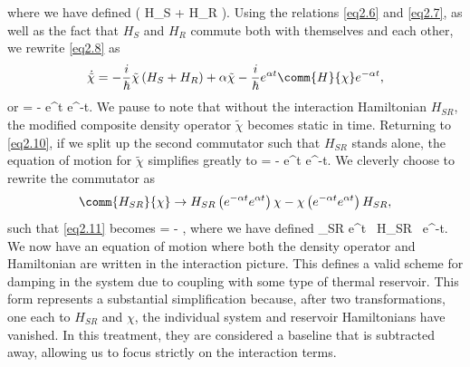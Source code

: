 %
where we have defined
%
\be \alpha \equiv {} \left( H_S + H_R \right). \label{eq2.9} \ee
%
Using the relations \eqref{eq2.6} and \eqref{eq2.7}, as well as the fact that $H_S$ and $H_R$ commute both with themselves and each other, we rewrite \eqref{eq2.8} as
%
\[ \dot{\tilde{\chi}} = -\frac{i}{\hbar} \tilde{\chi} \left( H_S + H_R \right) + \alpha \tilde{\chi} - \frac{i}{\hbar} e^{\alpha t} \comm{H}{\chi} e^{-\alpha t}, \]
%
or
%
\be \dot{\tilde{\chi}} =   -  e^{\alpha t}  e^{-\alpha t}. \label{eq2.10} \ee
%
We pause to note that without the interaction Hamiltonian $H_{SR}$, the modified composite density operator $\tilde{\chi}$ becomes static in time. Returning to \eqref{eq2.10}, if we split up the second commutator such that $H_{SR}$ stands alone, the equation of motion for $\tilde{\chi}$ simplifies greatly to
%
\be \dot{\tilde{\chi}} = - e^{\alpha t}  e^{-\alpha t}. \label{eq2.11} \ee
%
We cleverly choose to rewrite the commutator as
%
\[ \comm{H_{SR}}{\chi} \to H_{SR} \left( e^{-\alpha t} e^{\alpha t} \right) \chi - \chi \left( e^{-\alpha t} e^{\alpha t} \right) H_{SR}, \]
%
such that \eqref{eq2.11} becomes
%
\be \dot{\tilde{\chi}} = - , \label{eq2.12} \ee
%
where we have defined
%
\be {}_{SR} \equiv e^{\alpha t} \, H_{SR} \, e^{-\alpha t}. \label{eq2.13} \ee
%
We now have an equation of motion where both the density operator and Hamiltonian are written in the interaction picture. This defines a valid scheme for damping in the system due to coupling with some type of thermal reservoir. This form represents a substantial simplification because, after two transformations, one each to $H_{SR}$ and $\chi$, the individual system and reservoir Hamiltonians have vanished. In this treatment, they are considered a baseline that is subtracted away, allowing us to focus strictly on the interaction terms.

